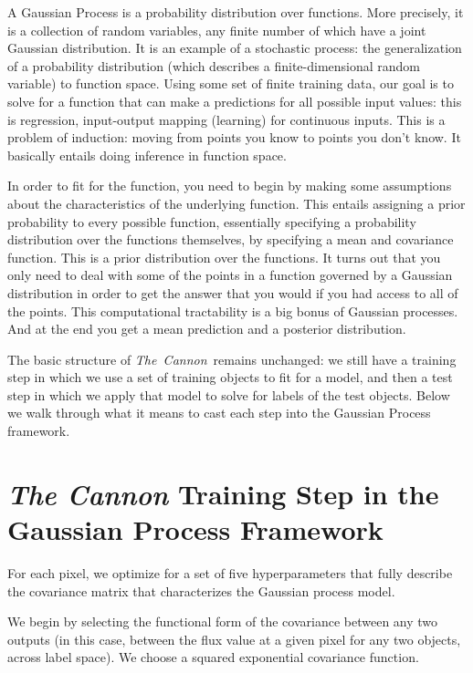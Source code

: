 \documentclass[12pt, preprint]{aastex}
\newcommand{\tc}{\textsl{The~Cannon}}
\begin{document}
A Gaussian Process is a probability distribution over functions. More
precisely, it is a collection of random variables, any finite number of which
have a joint Gaussian distribution. 
It is an example of a stochastic process: the generalization
of a probability distribution (which describes a finite-dimensional random
variable) to function space. Using some set of finite training data, our goal
is to solve for a function that can make a predictions for all possible
input values: this is regression, input-output mapping (learning) for 
continuous inputs. This is a problem of induction: moving from points you
know to points you don't know. It basically entails doing inference in 
function space. 

In order to fit for the function, you need to begin by making some assumptions 
about the characteristics of the 
underlying function. This entails assigning a prior probability to every 
possible function, essentially specifying a probability distribution over
the functions themselves, by specifying a mean and covariance function. 
This is a prior distribution over the functions.
It turns out that you only need to deal with
some of the points in a function governed by a Gaussian distribution in order
to get the answer that you would if you had access to all of the points. 
This computational tractability is a big bonus of Gaussian processes. 
And at the end you get 
a mean prediction and a posterior distribution.

The basic structure of \tc\ remains unchanged: we still have a training step
in which we use a set of training objects to fit for a model, and then a test
step in which we apply that model to solve for labels of the test objects. 
Below we walk through what it 
means to cast each step into the Gaussian Process framework.

\section{\emph{The Cannon} Training Step in the Gaussian Process Framework}

For each pixel, we optimize for a set of five hyperparameters that fully 
describe the covariance matrix that characterizes the Gaussian process model.

We begin by selecting the functional form of the covariance between any 
two outputs (in this case, between the flux value at a given pixel for any
two objects, across
label space). We choose a squared exponential covariance function. 
\end{document}
